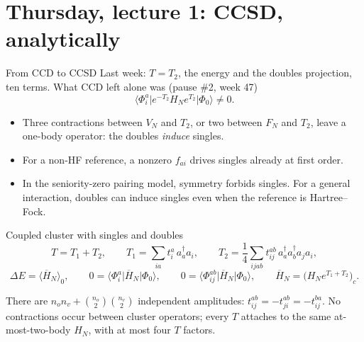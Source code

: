 \documentclass[aspectratio=169,10pt]{beamer}
\newcommand{\mel}[3]{\langle #1\lvert #2\rvert #3\rangle}
\newcommand{\av}[1]{\langle #1\rangle_0}
\newcommand{\cre}[1]{a_{#1}^{\dagger}}
\newcommand{\ann}[1]{a_{#1}}
\newcommand{\ph}{\Phi_0}
\newcommand{\Hbar}{\overline{H}}
\begin{document}
\section[Thursday 1: CCSD, analytically]{Thursday, lecture 1: CCSD, analytically}

\begin{frame}[shrink=1]{From CCD to CCSD}
\footnotesize
Last week: $T=T_2$, the energy and the doubles projection, ten terms. What CCD left alone was (pause \#2, week 47)
\[
 \mel{\Phi_i^a}{e^{-T_2}H_Ne^{T_2}}{\ph}\ne0 .
\]
\begin{itemize}
\item Three contractions between $V_N$ and $T_2$, or two between $F_N$ and $T_2$, leave a one-body operator: the doubles \emph{induce} singles.
\item For a non-HF reference, a nonzero $f_{ai}$ drives singles already at first order.
\item In the seniority-zero pairing model, symmetry forbids singles. For a general interaction, doubles can induce singles even when the reference is Hartree--Fock.
\end{itemize}
\begin{block}{Coupled cluster with singles and doubles}
\[
 T=T_1+T_2,\qquad T_1=\sum_{ia}t_i^a\,\cre a\ann i,\qquad T_2=\frac14\sum_{ijab}t_{ij}^{ab}\,\cre a\cre b\ann j\ann i,
\]
\[
 \Delta E=\av{\Hbar_N},\qquad
 0=\mel{\Phi_i^a}{\Hbar_N}{\ph},\qquad
 0=\mel{\Phi_{ij}^{ab}}{\Hbar_N}{\ph},\qquad \Hbar_N=\bigl(H_Ne^{T_1+T_2}\bigr)_c .
\]
\end{block}
There are $n_on_v+\binom{n_o}{2}\binom{n_v}{2}$ independent amplitudes: $t_{ij}^{ab}=-t_{ji}^{ab}=-t_{ij}^{ba}$. No contractions occur between cluster operators; every $T$ attaches to the same at-most-two-body $H_N$, with at most four $T$ factors.
\end{frame}
\end{document}
